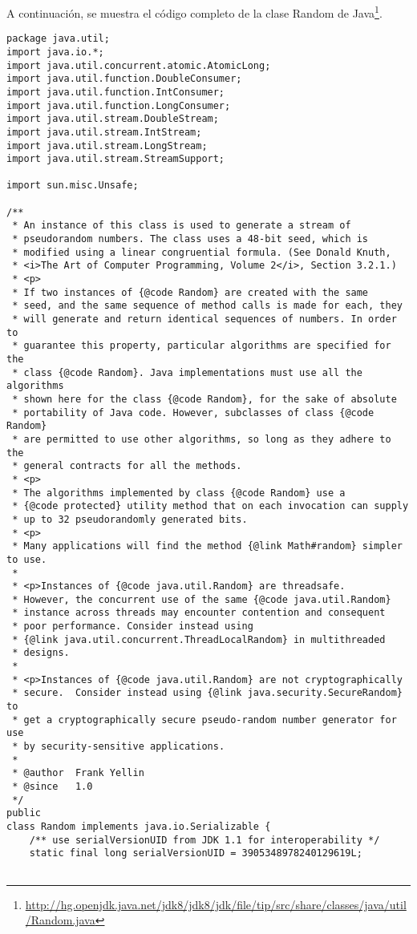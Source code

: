 \documentclass[12pt,a4paper,twoside,openright,titlepage,final]{article}
\begin{document}
A continuación, se muestra el código completo de la clase Random de Java\footnote{\url{http://hg.openjdk.java.net/jdk8/jdk8/jdk/file/tip/src/share/classes/java/util/Random.java}}.

\begin{verbatim}
package java.util;
import java.io.*;
import java.util.concurrent.atomic.AtomicLong;
import java.util.function.DoubleConsumer;
import java.util.function.IntConsumer;
import java.util.function.LongConsumer;
import java.util.stream.DoubleStream;
import java.util.stream.IntStream;
import java.util.stream.LongStream;
import java.util.stream.StreamSupport;

import sun.misc.Unsafe;

/**
 * An instance of this class is used to generate a stream of
 * pseudorandom numbers. The class uses a 48-bit seed, which is
 * modified using a linear congruential formula. (See Donald Knuth,
 * <i>The Art of Computer Programming, Volume 2</i>, Section 3.2.1.)
 * <p>
 * If two instances of {@code Random} are created with the same
 * seed, and the same sequence of method calls is made for each, they
 * will generate and return identical sequences of numbers. In order to
 * guarantee this property, particular algorithms are specified for the
 * class {@code Random}. Java implementations must use all the algorithms
 * shown here for the class {@code Random}, for the sake of absolute
 * portability of Java code. However, subclasses of class {@code Random}
 * are permitted to use other algorithms, so long as they adhere to the
 * general contracts for all the methods.
 * <p>
 * The algorithms implemented by class {@code Random} use a
 * {@code protected} utility method that on each invocation can supply
 * up to 32 pseudorandomly generated bits.
 * <p>
 * Many applications will find the method {@link Math#random} simpler to use.
 *
 * <p>Instances of {@code java.util.Random} are threadsafe.
 * However, the concurrent use of the same {@code java.util.Random}
 * instance across threads may encounter contention and consequent
 * poor performance. Consider instead using
 * {@link java.util.concurrent.ThreadLocalRandom} in multithreaded
 * designs.
 *
 * <p>Instances of {@code java.util.Random} are not cryptographically
 * secure.  Consider instead using {@link java.security.SecureRandom} to
 * get a cryptographically secure pseudo-random number generator for use
 * by security-sensitive applications.
 *
 * @author  Frank Yellin
 * @since   1.0
 */
public
class Random implements java.io.Serializable {
    /** use serialVersionUID from JDK 1.1 for interoperability */
    static final long serialVersionUID = 3905348978240129619L;


\end{verbatim}
\end{document}
